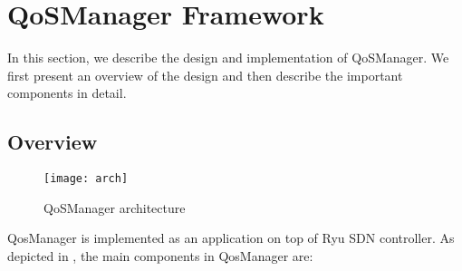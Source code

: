 \section{QoSManager Framework}
\label{sect:qosmanager}
In this section, we describe the design and implementation of QoSManager. We first present
an overview of the design and then describe the important components in detail.

\subsection{Overview}

\begin{figure}[htb]
\centering
\texttt{[image: arch]}
\caption{QoSManager architecture}
\label{fig:architecture}
\end{figure}

QosManager is implemented as an application on top of Ryu SDN controller. As depicted in ,
the main components in QosManager are: 

